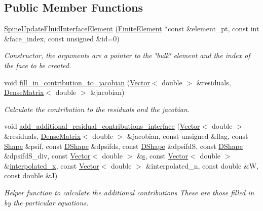 \subsection*{Public Member Functions}
\begin{DoxyCompactItemize}
\item 
\hyperlink{classoomph_1_1SpineUpdateFluidInterfaceElement_a2cc44705997f9fb44abf56ddb5f0cde0}{Spine\+Update\+Fluid\+Interface\+Element} (\hyperlink{classoomph_1_1FiniteElement}{Finite\+Element} $\ast$const \&element\+\_\+pt, const int \&face\+\_\+index, const unsigned \&id=0)
\begin{DoxyCompactList}\small\item\em Constructor, the arguments are a pointer to the \char`\"{}bulk\char`\"{} element and the index of the face to be created. \end{DoxyCompactList}\item 
void \hyperlink{classoomph_1_1SpineUpdateFluidInterfaceElement_a457ca93343689e34535054cf829a9499}{fill\+\_\+in\+\_\+contribution\+\_\+to\+\_\+jacobian} (\hyperlink{classoomph_1_1Vector}{Vector}$<$ double $>$ \&residuals, \hyperlink{classoomph_1_1DenseMatrix}{Dense\+Matrix}$<$ double $>$ \&jacobian)
\begin{DoxyCompactList}\small\item\em Calculate the contribution to the residuals and the jacobian. \end{DoxyCompactList}\item 
void \hyperlink{classoomph_1_1SpineUpdateFluidInterfaceElement_a3958845051cafecd8e73745fc04c7a78}{add\+\_\+additional\+\_\+residual\+\_\+contributions\+\_\+interface} (\hyperlink{classoomph_1_1Vector}{Vector}$<$ double $>$ \&residuals, \hyperlink{classoomph_1_1DenseMatrix}{Dense\+Matrix}$<$ double $>$ \&jacobian, const unsigned \&flag, const \hyperlink{classoomph_1_1Shape}{Shape} \&psif, const \hyperlink{classoomph_1_1DShape}{D\+Shape} \&dpsifds, const \hyperlink{classoomph_1_1DShape}{D\+Shape} \&dpsifdS, const \hyperlink{classoomph_1_1DShape}{D\+Shape} \&dpsifd\+S\+\_\+div, const \hyperlink{classoomph_1_1Vector}{Vector}$<$ double $>$ \&\hyperlink{cfortran_8h_ab7123126e4885ef647dd9c6e3807a21c}{s}, const \hyperlink{classoomph_1_1Vector}{Vector}$<$ double $>$ \&\hyperlink{classoomph_1_1FiniteElement_a5a9c1ead9819cd17603096e63087020f}{interpolated\+\_\+x}, const \hyperlink{classoomph_1_1Vector}{Vector}$<$ double $>$ \&interpolated\+\_\+n, const double \&W, const double \&J)
\begin{DoxyCompactList}\small\item\em Helper function to calculate the additional contributions These are those filled in by the particular equations. \end{DoxyCompactList}\item 

\end{DoxyCompactItemize}

